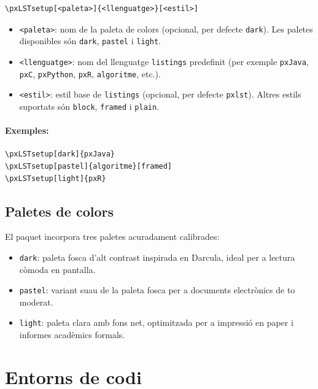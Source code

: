 \documentclass[11pt,a4paper]{article}
\begin{document}
\begin{verbatim}
\pxLSTsetup[<paleta>]{<llenguatge>}[<estil>]
\end{verbatim}

\begin{itemize}
  \item \texttt{<paleta>}: nom de la paleta de colors (opcional, per defecte \texttt{dark}). Les paletes disponibles s\'on \texttt{dark}, \texttt{pastel} i \texttt{light}.
  \item \texttt{<llenguatge>}: nom del llenguatge \texttt{listings} predefinit (per exemple \texttt{pxJava}, \texttt{pxC}, \texttt{pxPython}, \texttt{pxR}, \texttt{algoritme}, etc.).
  \item \texttt{<estil>}: estil base de \texttt{listings} (opcional, per defecte \texttt{pxlst}). Altres estils suportats s\'on \texttt{block}, \texttt{framed} i \texttt{plain}.
\end{itemize}

\paragraph{Exemples:}

\begin{verbatim}
\pxLSTsetup[dark]{pxJava}
\pxLSTsetup[pastel]{algoritme}[framed]
\pxLSTsetup[light]{pxR}
\end{verbatim}

\subsection{Paletes de colors}

El paquet incorpora tres paletes acuradament calibrades:

\begin{itemize}
  \item \texttt{dark}: paleta fosca d'alt contrast inspirada en Darcula, ideal per a lectura c\`omoda en pantalla.
  \item \texttt{pastel}: variant suau de la paleta fosca per a documents electr\`onics de to moderat.
  \item \texttt{light}: paleta clara amb fons net, optimitzada per a impressi\'o en paper i informes acad\`emics formals.
\end{itemize}

\section{Entorns de codi}
\end{document}
